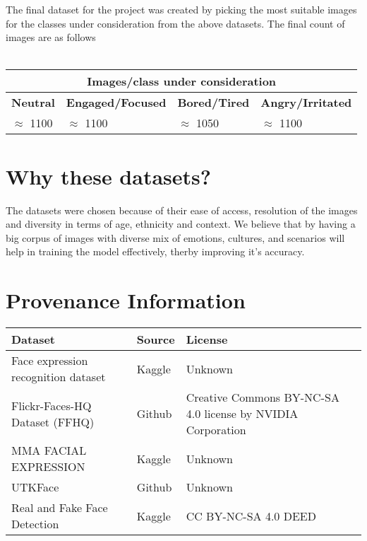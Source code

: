     \noindent The final dataset\cite{6721Dataset} for the project was created by picking the most suitable images for the classes under consideration from the above datasets. The final count of images are as follows\\\\
        \begin{tabular}{ |p{3cm}||p{3cm} ||p{3cm} ||p{3cm} | }
            \hline
            \multicolumn{4}{|c|}{\textbf{Images/class under consideration}} \\
            \hline
            \textbf{Neutral} & \textbf{Engaged/Focused} & \textbf{Bored/Tired} & \textbf{Angry/Irritated} \\
            \hline
            $\approx$ 1100 & $\approx$ 1100 & $\approx$ 1050 & $\approx$ 1100\\
            \hline
        \end{tabular}
    \vspace*{1em}
\section{Why these datasets?}
\noindent The datasets were chosen because of their ease of access, resolution of the images and diversity in terms of age, ethnicity and context. We believe that by having a big corpus of images with diverse mix of emotions, cultures, and scenarios will help in training the model effectively, therby improving it's accuracy. \\
\section{Provenance Information}
    \begin{tabular}{ |p{3cm}||p{3cm} ||p{3cm} | }
        \hline
        \textbf{Dataset} & \textbf{Source} & \textbf{License}\\
        \hline
        Face expression recognition dataset & Kaggle \cite{KaggleDataset} & Unknown\\
        \hline
        Flickr-Faces-HQ Dataset (FFHQ) & Github \cite{FFHQ} & Creative Commons BY-NC-SA 4.0 license by NVIDIA Corporation \cite{CreativeCommonsBY-NC2.0}\\
        \hline
        MMA FACIAL EXPRESSION & Kaggle \cite{MMAKaggleDataset} & Unknown\\
        \hline
        UTKFace & Github \cite{UTKFace} & Unknown\\
        \hline
        Real and Fake Face Detection & Kaggle \cite{RealFakeKaggle} & CC BY-NC-SA 4.0 DEED\cite{CC-BY-NC-SA4.0-DEED}\\
        \hline
    \end{tabular}

